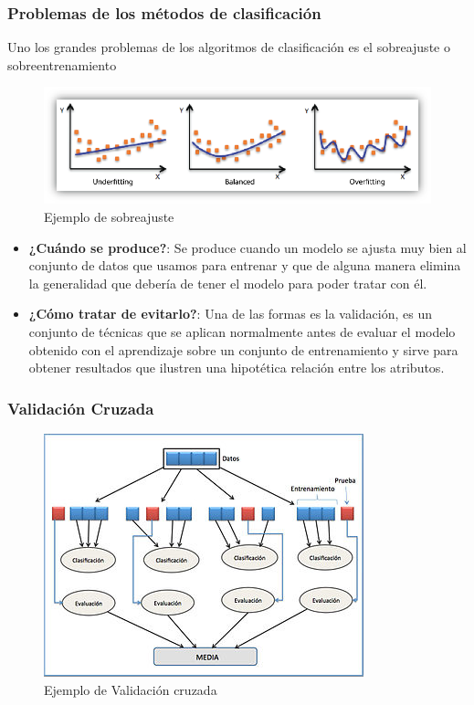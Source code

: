 \documentclass[9pt]{beamer} %
\begin{document}
	\begin{frame}
	\frametitle{Problemas de los métodos de clasificación}
	Uno los grandes problemas de los algoritmos de clasificación es el sobreajuste o sobreentrenamiento
		\begin{figure}[H]
			\includegraphics[scale=0.30]{overfitting.png} 
			\caption{Ejemplo de sobreajuste}
		\end{figure}
		\begin{itemize}
			\item \textbf{¿Cuándo se produce?}: Se produce cuando un modelo se ajusta muy bien al conjunto de datos que usamos para entrenar y que de alguna manera elimina la generalidad que debería de tener el modelo para poder tratar con él.
			\item \textbf{¿Cómo tratar de evitarlo?}: Una de las formas es la validación, es un conjunto de técnicas que se aplican normalmente antes de evaluar el modelo obtenido con el aprendizaje sobre un conjunto de entrenamiento y sirve para obtener resultados que ilustren una hipotética relación entre los atributos.
		\end{itemize}
	\end{frame}
	
	\begin{frame}
	\frametitle{Validación Cruzada}
		\begin{figure}[H]
		\includegraphics[scale=0.6]{5-fold} 
		\caption{Ejemplo de Validación cruzada}
	\end{figure}
	\end{frame}
	
\end{document}
